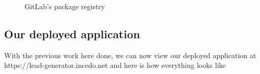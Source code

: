 \begin{figure}[H]
    \centering
    \caption{GitLab's package registry}
    \label{fig:gitlab-package-registry}
\end{figure}
\newpage

\subsection{Our deployed application}
With the previous work here done, we can now view our deployed application at https://lead-generator.incedo.net
and here is how everything looks like

